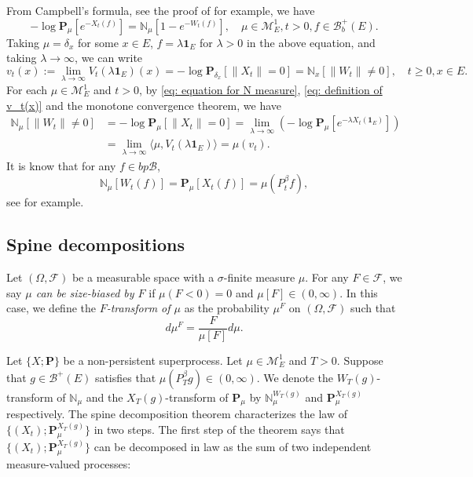\documentclass[12pt, a4paper]{amsart}
\theoremstyle{definition}
\numberwithin{equation}{section}
\begin{document}
	
	From  Campbell's formula, see  the proof of \cite[Theorem 2.7]{Kyprianou2014Fluctuations} for example, we have
\[ \label{eq: equation for N measure}
	- \log \mathbf P_\mu [e^{-X_t(f)}]
	= \mathbb N_\mu[ 1-e^{- W_t(f)}],
	\quad \mu \in \mathcal M_E^1, t>0,
		f\in \mathscr B_b^+(E).
\]
	Taking $\mu = \delta_x$ for some $x\in E$, $f = \lambda \mathbf 1_E$ for $\lambda > 0$ in the above equation, and taking $\lambda \to \infty$, we can write
\[ \label{eq: definition of v_t(x)}
	v_t(x)
	:= \lim_{\lambda\to \infty} V_t(\lambda\mathbf 1_E)(x)
	= -\log \mathbf P_{\delta_x} [\|X_t\|=0]
	= \mathbb N_x[\|W_t\|\neq 0],
	\quad t\geq 0, x\in E.
\]
	For each $\mu \in \mathcal M_E^1$ and $t > 0$, by \eqref{eq: equation for N measure}, \eqref{eq: definition of v_t(x)} and the monotone convergence theorem, we have
\[ \label{eq: equation for mu v-t}\begin{split}
    \mathbb N_\mu[\|W_t\|\neq 0]
	&= -\log \mathbf P_{\mu} [\|X_t\|=0]
	= \lim_{\lambda \to \infty} (- \log \mathbf P_\mu [e^{-\lambda X_t(\mathbf 1_E)}])
	\\&= \lim_{\lambda \to \infty} \langle \mu, V_t(\lambda \mathbf 1_E)\rangle
	= \mu(v_t).
\end{split}\]
    It is know that for any $f\in bp{\mathscr B}$,
\[\label{eq: mean of kuz measure}
    \mathbb N_{\mu}[W_t(f)]
    =\mathbf P_{\mu}[X_t(f)]=\mu(P^\beta_tf),
\]
    see \cite[Lemma 3.3]{RenSongSun2017Spine} for example.


\subsection{Spine decompositions}
\label{sec: Spine decompositions}
	Let $(\Omega, \mathscr F)$ be a measurable space with a $\sigma$-finite measure $\mu$.
	For any $F\in \mathscr F$, we say \emph{$\mu$ can be size-biased by $F$} if $\mu(F< 0) = 0$ and
	$\mu [F] \in (0,\infty)$.
	In this case, we define the \emph{$F$-transform of $\mu$} as the probability $\mu^F$ on $(\Omega, \mathscr F)$ such that
	$$d\mu^F= \frac{F}{\mu[F]}d \mu.$$

	Let $\{X;\mathbf P\}$ be a non-persistent superprocess.
	Let $\mu \in \mathcal M^1_E$ and $T>0$.
	Suppose that $g\in \mathscr B^+(E)$ satisfies that $\mu(P^\beta_Tg) \in (0,\infty)$.
	We denote  the $W_T(g)$-transform of $\mathbb N_\mu$ and the $X_T(g)$-transform of $\mathbf P_\mu$
	by $\mathbb N^{W_T(g)}_\mu$ and $\mathbf P_\mu^{X_T(g)}$ respectively.
	The  spine decomposition theorem characterizes the law of $\{(X_t); \mathbf P_\mu^{X_T(g)}\}$ in two steps.
	The first step of the theorem says that $\{(X_t); \mathbf P_\mu^{X_T(g)}\}$ can be decomposed in law as the sum of two independent measure-valued processes:
	
\end{document}
